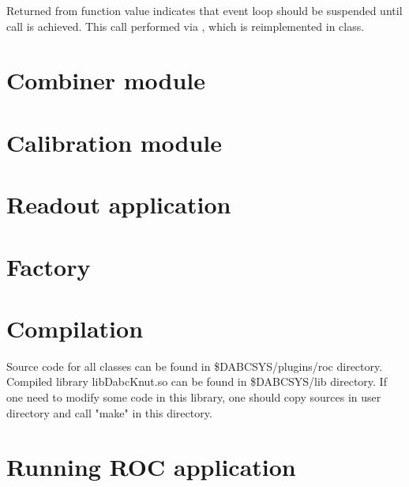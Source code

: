 Returned from function  value  indicates 
that event loop should be suspended until call  is achieved.
This call performed via , which is reimplemented in  class. 




\section{Combiner module}

\section{Calibration module}

\section{Readout application}

\section{Factory}

\section{Compilation}
Source code for all classes can be found in \$DABCSYS/plugins/roc directory. 
Compiled library libDabcKnut.so can be found in \$DABCSYS/lib directory.
If one need to modify some code in this library, one should copy sources in 
user directory and call "make" in this directory. 
 
\section{Running ROC application}